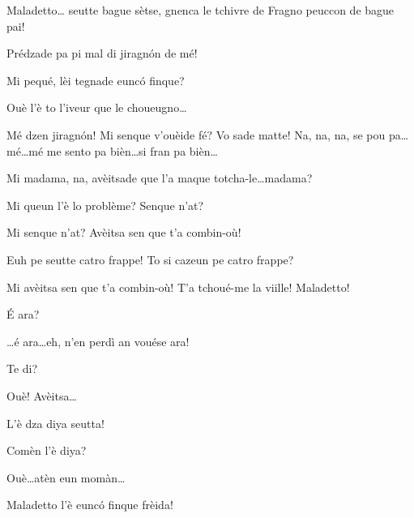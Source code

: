 \begin{drama}
\Cimaspeaks Maladetto\ldots {} seutte bague sètse, gnenca le tchivre de Fragno peuccon de bague pai!

\Saventaspeaks Prédzade pa pi mal di jiragn\'on de mé!

\Cimaspeaks Mi pequé, lèi tegnade eunc\'o finque?

\Saventaspeaks Ouè l'è to l'iveur que le choueugno\ldots


\Saventaspeaks {} Mé dzen jiragn\'on! Mi senque v'ou\-è\-i\-de fé? Vo sade matte! Na, na, na, se pou pa\ldots mé\ldots mé me sento pa bièn\ldots si fran pa bièn\ldots


\Cimaspeaks Mi madama, na, avèitsade que l'a maque totcha-le\ldots madama?

\Marcospeaks {} Mi queun l'è lo problème? Sen\-que n'at?

\Cimaspeaks Mi senque n'at? Avèitsa sen que t'a combin-où!

\Marcospeaks Euh pe seutte catro frappe! To si cazeun pe catro frappe?

\Cimaspeaks Mi avèitsa  sen que t'a combin-où! T'a tchoué-me la viille! Maladetto!

\Marcospeaks \'E ara?

\Cimaspeaks  \ldots é ara\ldots eh, n'en perdì an vouése ara!

\Marcospeaks Te di?

\Cimaspeaks Ouè! Avèitsa\ldots


\Cimaspeaks L'è dza diya seutta!

\Marcospeaks Comèn l'è diya?

\Cimaspeaks Ouè\ldots atèn eun momàn\ldots


\Cimaspeaks Maladetto l'è eunc\'o finque frèida!


\end{drama}
